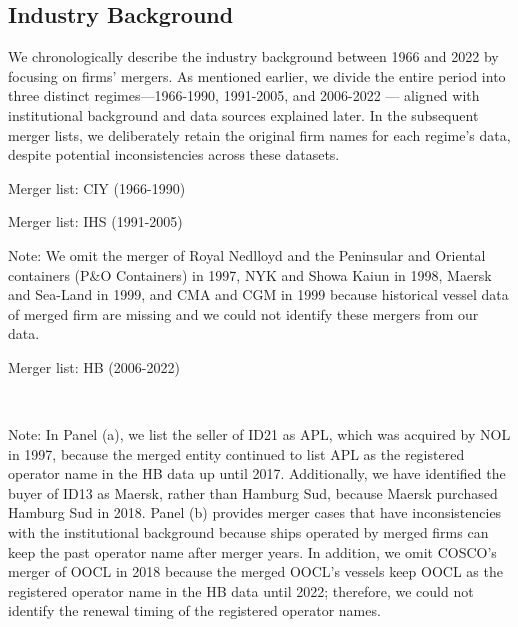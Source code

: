 \documentclass[10pt]{article}
\begin{document}
\subsection{Industry Background}\label{sec:industry_background}
We chronologically describe the industry background between 1966 and 2022  by focusing on firms' mergers. 
As mentioned earlier, we divide the entire period into three distinct regimes—1966-1990, 1991-2005, and 2006-2022 — aligned with institutional background and data sources explained later.
In the subsequent merger lists, we deliberately retain the original firm names for each regime's data, despite potential inconsistencies across these datasets.

\begin{table}[!htbp]
  \begin{center}
      \caption{Merger list: CIY (1966-1990)}
      \label{tb:merger_list_CIY} 
      
  \end{center}\footnotesize
\end{table} 

\begin{table}[!htbp]
  \begin{center}
      \caption{Merger list: IHS (1991-2005)}
      \label{tb:merger_list_IHS} 
      
  \end{center}\footnotesize
  Note: We omit the merger of Royal Nedlloyd and the Peninsular and Oriental containers (P\&O Containers) in 1997, NYK and Showa Kaiun in 1998, Maersk and Sea-Land in 1999, and CMA and CGM in 1999 because historical vessel data of merged firm are missing and we could not identify these mergers from our data.
\end{table} 

\begin{table}[!htbp]
  \begin{center}
      \caption{Merger list: HB (2006-2022)}
      \label{tb:merger_list_HB} 
      \subfloat[HB (2006-2022)]{}\\
  \end{center}\footnotesize
  Note: In Panel (a), we list the seller of ID21 as APL, which was acquired by NOL in 1997, because the merged entity continued to list APL as the registered operator name in the HB data up until 2017. Additionally, we have identified the buyer of ID13 as Maersk, rather than Hamburg Sud, because Maersk purchased Hamburg Sud in 2018.
  Panel (b) provides merger cases that have inconsistencies with the institutional background because ships operated by merged firms can keep the past operator name after merger years.  In addition, we omit COSCO's merger of OOCL in 2018 because the merged OOCL's vessels keep OOCL as the registered operator name in the HB data until 2022; therefore, we could not identify the renewal timing of the registered operator names.
\end{table} 
\end{document}

